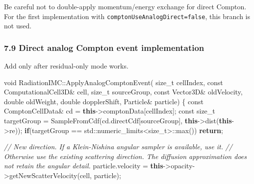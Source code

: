\documentclass[
]{article}
\newenvironment{Shaded}{}{}
\newcommand{\AttributeTok}[1]{\textcolor[rgb]{0.49,0.56,0.16}{#1}}
\newcommand{\BuiltInTok}[1]{\textcolor[rgb]{0.00,0.50,0.00}{#1}}
\newcommand{\CommentTok}[1]{\textcolor[rgb]{0.38,0.63,0.69}{\textit{#1}}}
\newcommand{\ControlFlowTok}[1]{\textcolor[rgb]{0.00,0.44,0.13}{\textbf{#1}}}
\newcommand{\DataTypeTok}[1]{\textcolor[rgb]{0.56,0.13,0.00}{#1}}
\newcommand{\KeywordTok}[1]{\textcolor[rgb]{0.00,0.44,0.13}{\textbf{#1}}}
\newcommand{\NormalTok}[1]{#1}
\newcommand{\OperatorTok}[1]{\textcolor[rgb]{0.40,0.40,0.40}{#1}}
\begin{document}
Be careful not to double-apply momentum/energy exchange for direct
Compton. For the first implementation with
\texttt{comptonUseAnalogDirect=false}, this branch is not used.

\subsubsection{7.9 Direct analog Compton event
implementation}\label{direct-analog-compton-event-implementation}

Add only after residual-only mode works.

\begin{Shaded}
\begin{Highlighting}[]
\DataTypeTok{void}\NormalTok{ RadiationIMC}\OperatorTok{::}\NormalTok{ApplyAnalogComptonEvent}\OperatorTok{(}
    \DataTypeTok{size\_t}\NormalTok{ cellIndex}\OperatorTok{,}
    \AttributeTok{const}\NormalTok{ ComputationalCell3D}\OperatorTok{\&}\NormalTok{ cell}\OperatorTok{,}
    \DataTypeTok{size\_t}\NormalTok{ sourceGroup}\OperatorTok{,}
    \AttributeTok{const}\NormalTok{ Vector3D}\OperatorTok{\&}\NormalTok{ oldVelocity}\OperatorTok{,}
    \DataTypeTok{double}\NormalTok{ oldWeight}\OperatorTok{,}
    \DataTypeTok{double}\NormalTok{ dopplerShift}\OperatorTok{,}
\NormalTok{    Particle}\OperatorTok{\&}\NormalTok{ particle}\OperatorTok{)}
\OperatorTok{\{}
    \AttributeTok{const}\NormalTok{ ComptonCellData}\OperatorTok{\&}\NormalTok{ cd }\OperatorTok{=} \KeywordTok{this}\OperatorTok{{-}\textgreater{}}\NormalTok{comptonData}\OperatorTok{[}\NormalTok{cellIndex}\OperatorTok{];}
    \AttributeTok{const} \DataTypeTok{size\_t}\NormalTok{ targetGroup }\OperatorTok{=}\NormalTok{ SampleFromCdf}\OperatorTok{(}\NormalTok{cd}\OperatorTok{.}\NormalTok{directCdf}\OperatorTok{[}\NormalTok{sourceGroup}\OperatorTok{],} \KeywordTok{this}\OperatorTok{{-}\textgreater{}}\NormalTok{dist}\OperatorTok{(}\KeywordTok{this}\OperatorTok{{-}\textgreater{}}\NormalTok{re}\OperatorTok{));}
    \ControlFlowTok{if}\OperatorTok{(}\NormalTok{targetGroup }\OperatorTok{==} \BuiltInTok{std::}\NormalTok{numeric\_limits}\OperatorTok{\textless{}}\DataTypeTok{size\_t}\OperatorTok{\textgreater{}::}\NormalTok{max}\OperatorTok{())}
        \ControlFlowTok{return}\OperatorTok{;}

    \CommentTok{// New direction. If a Klein{-}Nishina angular sampler is available, use it.}
    \CommentTok{// Otherwise use the existing scattering direction. The diffusion approximation does not retain the angular detail.}
\NormalTok{    particle}\OperatorTok{.}\NormalTok{velocity }\OperatorTok{=} \KeywordTok{this}\OperatorTok{{-}\textgreater{}}\NormalTok{opacity}\OperatorTok{{-}\textgreater{}}\NormalTok{getNewScatterVelocity}\OperatorTok{(}\NormalTok{cell}\OperatorTok{,}\NormalTok{ particle}\OperatorTok{);}


\end{Highlighting}
\end{Shaded}
\end{document}
